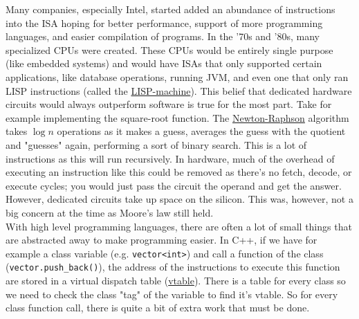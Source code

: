 \documentclass[10pt]{article}
\begin{document}
\newline
Many companies, especially Intel, started added an abundance of instructions into the ISA hoping for better performance, support of more programming languages, and easier compilation of programs. In the '70s and '80s, many specialized CPUs were created. These CPUs would be entirely single purpose (like embedded systems) and would have ISAs that only supported certain applications, like database operations, running JVM, and even one that only ran LISP instructions (called the \href{https://en.wikipedia.org/wiki/Lisp_machine}{LISP-machine}). This belief that dedicated hardware circuits would always outperform software is true for the most part. Take for example implementing the square-root function. The \href{https://en.wikipedia.org/wiki/Newton\%27s_method}{Newton-Raphson} algorithm takes $\log n$ operations as it makes a guess, averages the guess with the quotient and "guesses" again, performing a sort of binary search. This is a lot of instructions as this will run recursively. In hardware, much of the overhead of executing an instruction like this could be removed as there's no fetch, decode, or execute cycles; you would just pass the circuit the operand and get the answer. However, dedicated circuits take up space on the silicon. This was, however, not a big concern at the time as Moore's law still held.\\
\newline
With high level programming languages, there are often a lot of small things that are abstracted away to make programming easier. In C++, if we have for example a class variable (e.g. \texttt{vector<int>}) and call a function of the class (\texttt{vector.push\_back()}), the address of the instructions to execute this function are stored in a virtual dispatch table (\href{https://pabloariasal.github.io/2017/06/10/understanding-virtual-tables/}{vtable}). There is a table for every class so we need to check the class "tag" of the variable to find it's vtable. So for every class function call, there is quite a bit of extra work that must be done.\\
\end{document}
